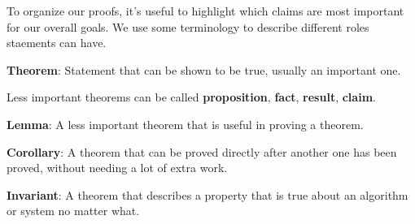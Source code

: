 
To organize our proofs, it's useful to highlight which claims are most important for our overall goals.
We use some terminology to describe different roles staements can have.

{\bf Theorem}: Statement that can be shown to be true, usually an important one.

Less important theorems can be called {\bf proposition}, {\bf fact}, {\bf result}, {\bf claim}.

{\bf Lemma}: A less important theorem that is useful in proving a theorem.
 
{\bf Corollary}: A theorem that can be proved directly after another one has been proved, 
without needing a lot of extra work.

{\bf Invariant}: A theorem that describes a property that is true about an algorithm or system no matter what.




